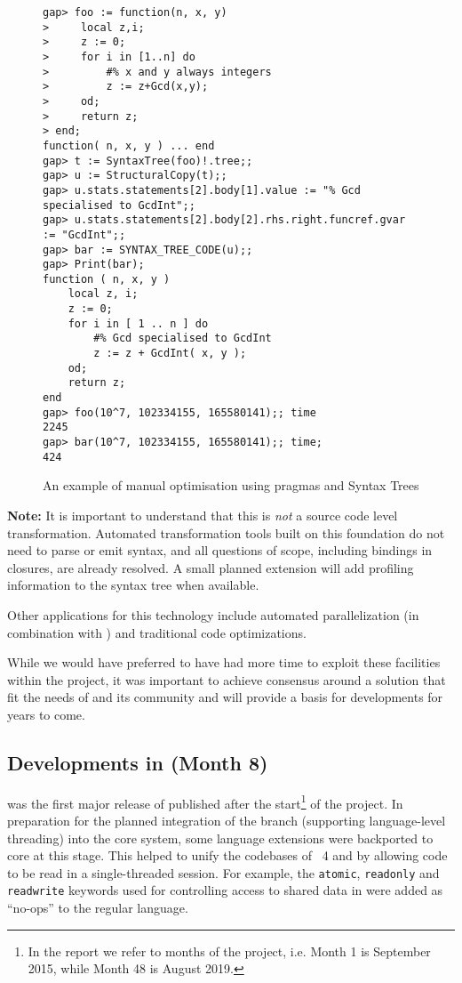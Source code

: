 \begin{figure}[!ht]
  \begin{mdframed}
\begin{Small}
\begin{verbatim}
gap> foo := function(n, x, y)
>     local z,i;
>     z := 0;
>     for i in [1..n] do
>         #% x and y always integers
>         z := z+Gcd(x,y);
>     od;
>     return z;
> end;
function( n, x, y ) ... end
gap> t := SyntaxTree(foo)!.tree;;
gap> u := StructuralCopy(t);;
gap> u.stats.statements[2].body[1].value := "% Gcd specialised to GcdInt";;
gap> u.stats.statements[2].body[2].rhs.right.funcref.gvar := "GcdInt";;
gap> bar := SYNTAX_TREE_CODE(u);;
gap> Print(bar);
function ( n, x, y )
    local z, i;
    z := 0;
    for i in [ 1 .. n ] do
        #% Gcd specialised to GcdInt
        z := z + GcdInt( x, y );
    od;
    return z;
end
gap> foo(10^7, 102334155, 165580141);; time
2245
gap> bar(10^7, 102334155, 165580141);; time;
424
\end{verbatim}
\end{Small}
  \end{mdframed}
  \caption{An example of manual optimisation using pragmas and Syntax
    Trees}\label{fig:using-syntaxtree}
  \end{figure}
  

\textbf{Note:} It is important to understand that this is \emph{not} a
source code level transformation. Automated transformation tools built
on this foundation do
not need to parse or emit \GAP syntax, and all questions of scope,
including bindings in closures, are already resolved. A small planned
extension will add profiling information to the syntax tree when available.

Other applications for this technology include automated
parallelization (in combination with \HPCGAP) and traditional code optimizations.

While we would have preferred to have had more time to exploit these
facilities within the project, it was important to achieve consensus
around a solution that fit the needs of \GAP and its community and
will provide a basis for developments for years to come.

\subsection{Developments in  (Month 8)}\label{gap-4.8}

 was the first major release of \GAP published
after the start\footnote{In the report we
refer to months of the project, i.e. Month 1 is September 2015, while Month 48 is August 2019.}
of the \ODK project. 
In preparation for the planned integration of the \HPCGAP branch
(supporting \GAP language-level threading) into
the core system, some language extensions were backported to core
\GAP at this stage. 
This helped to unify the codebases of \GAP~4 and \HPCGAP
by allowing \HPCGAP code to be read in a single-threaded
\GAP session. For example, the
\verb|atomic|, \verb|readonly| and \verb|readwrite| keywords used for
controlling access to shared data in \HPCGAP were
added as ``no-ops'' to the regular \GAP language.


